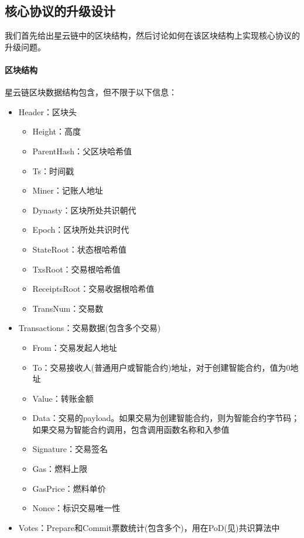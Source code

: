 \subsection{核心协议的升级设计}

我们首先给出星云链中的区块结构，然后讨论如何在该区块结构上实现核心协议的升级问题。

\paragraph{区块结构}

星云链区块数据结构包含，但不限于以下信息：
\begin{itemize}
	\item Header：区块头
		\begin{itemize}
		\item Height：高度
		\item ParentHash：父区块哈希值
		\item Ts：时间戳
		\item Miner：记账人地址
		\item Dynasty：区块所处共识朝代
		\item Epoch：区块所处共识时代
		\item StateRoot：状态根哈希值
		\item TxsRoot：交易根哈希值
		\item ReceiptsRoot：交易收据根哈希值
		\item TransNum：交易数
		\end{itemize}
	\item Transactions：交易数据(包含多个交易)
		\begin{itemize}
		\item From：交易发起人地址
		\item To：交易接收人(普通用户或智能合约)地址，对于创建智能合约，值为0地址
		\item Value：转账金额
		\item Data：交易的payload。如果交易为创建智能合约，则为智能合约字节码；如果交易为智能合约调用，包含调用函数名称和入参值
		\item Signature：交易签名
		\item Gas：燃料上限
		\item GasPrice：燃料单价
		\item Nonce：标识交易唯一性
		\end{itemize}
	\item Votes：Prepare和Commit票数统计(包含多个)，用在PoD(见)共识算法中
		\begin{itemize}

\end{itemize}
\end{itemize}
